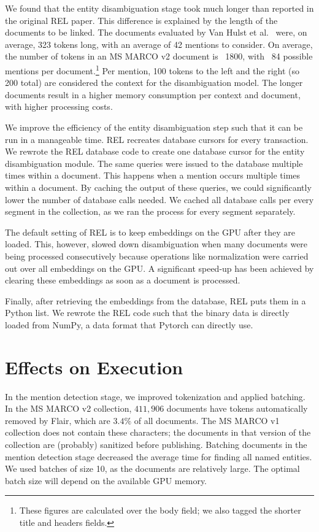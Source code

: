 We found that the entity disambiguation stage took much longer than reported in the original REL paper. This difference is explained by the length of the documents to be linked. The documents evaluated by Van Hulst et al.~\cite{REL} were, on average, 323 tokens long, with an average of 42 mentions to consider. On average, the number of tokens in an MS MARCO v2 document is ~1800, with ~84 possible mentions per document.\footnote{These figures are calculated over the body field; we also tagged the shorter title and headers fields.}
Per mention, 100 tokens to the left and the right (so 200 total) are considered the context for the disambiguation model. 
The longer documents result in a higher memory consumption per context and document, with higher processing costs.

We improve the efficiency of the entity disambiguation step such that it can be run in a manageable time. REL recreates database cursors for every transaction. We rewrote the REL database code to create one database cursor for the entity disambiguation module. 
The same queries were issued to the database multiple times within a document. This happens when a mention occurs multiple times within a document. By caching the output of these queries, we could significantly lower the number of database calls needed. We cached all database calls per every segment in the collection, as we ran the process for every segment separately. 

The default setting of REL is to keep embeddings on the GPU after they are loaded. This, however, slowed down disambiguation when many documents were being processed consecutively because operations like normalization were carried out over all embeddings on the GPU. A significant speed-up has been achieved by clearing these embeddings as soon as a document is processed.

Finally, after retrieving the embeddings from the database, REL puts them in a Python list. We rewrote the REL code such that the binary data is directly loaded from NumPy, a data format that Pytorch can directly use. 

\section{Effects on Execution}
In the mention detection stage, we improved tokenization and applied batching. In the MS MARCO v2 collection, $411,906$ documents have tokens automatically removed by Flair, which are $3.4\%$ of all documents. The MS MARCO v1 collection does not contain these characters; the documents in that version of the collection are (probably) sanitized before publishing.
Batching documents in the mention detection stage decreased the average time for finding all named entities. We used batches of size 10, as the documents are relatively large. The optimal batch size will depend on the available GPU memory.

